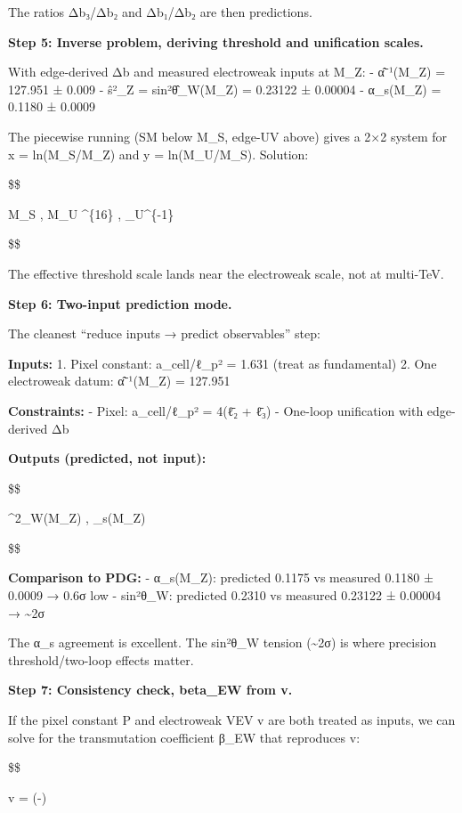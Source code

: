 \documentclass[11pt,a4paper]{article}
\theoremstyle{remark}
\begin{document}
The ratios Δb₃/Δb₂ and Δb₁/Δb₂ are then predictions.

\textbf{Step 5: Inverse problem, deriving threshold and unification scales.}

With edge-derived Δb and measured electroweak inputs at M\_Z:
- α̂⁻¹(M\_Z) = 127.951 ± 0.009
- ŝ²\_Z = sin²θ̂\_W(M\_Z) = 0.23122 ± 0.00004
- α\_s(M\_Z) = 0.1180 ± 0.0009

The piecewise running (SM below M\_S, edge-UV above) gives a 2×2 system for x = ln(M\_S/M\_Z) and y = ln(M\_U/M\_S). Solution:

\$\$

M\_S  , \quad M\_U  \^{}\{16\} , \quad \alpha\_U\^{}\{-1\} 

\$\$

The effective threshold scale lands near the electroweak scale, not at multi-TeV.

\textbf{Step 6: Two-input prediction mode.}

The cleanest ``reduce inputs → predict observables'' step:

\textbf{Inputs:}
1. Pixel constant: a\_cell/ℓ\_p² = 1.631 (treat as fundamental)
2. One electroweak datum: α̂⁻¹(M\_Z) = 127.951

\textbf{Constraints:}
- Pixel: a\_cell/ℓ\_p² = 4(ℓ̄₂ + ℓ̄₃)
- One-loop unification with edge-derived Δb

\textbf{Outputs (predicted, not input):}

\$\$

\sin\^{}2\hat{\theta}\_W(M\_Z) , \qquad \alpha\_s(M\_Z) 

\$\$

\textbf{Comparison to PDG:}
- α\_s(M\_Z): predicted 0.1175 vs measured 0.1180 ± 0.0009 → 0.6σ low
- sin²θ\_W: predicted 0.2310 vs measured 0.23122 ± 0.00004 → \textasciitilde2σ

The α\_s agreement is excellent. The sin²θ\_W tension (\textasciitilde2σ) is where precision threshold/two-loop effects matter.

\textbf{Step 7: Consistency check, beta\_EW from v.}

If the pixel constant P and electroweak VEV v are both treated as inputs, we can solve for the transmutation coefficient β\_EW that reproduces v:

\$\$

v =  \exp\left(-\right)
\end{document}
